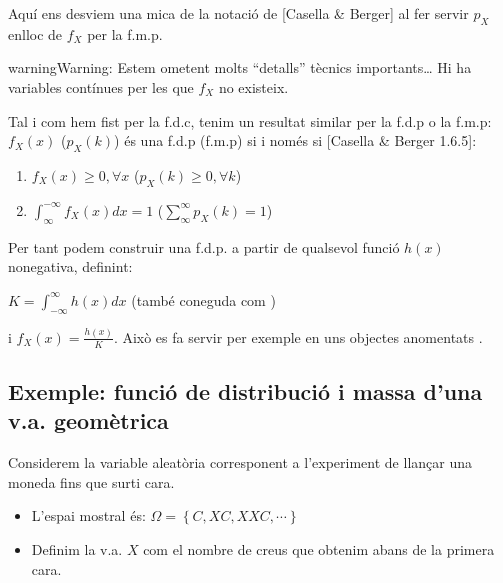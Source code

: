 \documentclass[letterpaper,10pt,english]{sphinxmanual}
\begin{document}
Aquí ens desviem una mica de la notació de {[}Casella \& Berger{]} al fer servir \(p_X\) enlloc de \(f_X\) per la f.m.p.

\begin{sphinxadmonition}{warning}{Warning:}
Estem ometent molts “detalls” tècnics importants… Hi ha variables contínues per les que \(f_X\) no existeix.
\end{sphinxadmonition}

Tal i com hem fist per la f.d.c, tenim un resultat similar per la f.d.p o la f.m.p: \(f_X\left(x\right)\) (\(p_X\left(k\right)\))
és una f.d.p (f.m.p) si i només si {[}Casella \& Berger 1.6.5{]}:
\begin{enumerate}
%
\item {} 
\(f_X\left(x\right) \geq 0, \forall x\) (\(p_X\left(k\right) \geq 0, \forall k\))

\item {} 
\(\int_{\infty}^{-\infty} f_X\left(x\right)dx = 1\) (\(\sum_{\infty}^{\infty} p_X\left(k\right) = 1\))

\end{enumerate}

Per tant podem construir una f.d.p. a partir de qualsevol funció \(h\left(x\right)\) no\sphinxhyphen{}negativa, definint:

\(K = \int_{-\infty}^{\infty} h\left(x\right)dx\) (també coneguda com )

i \(f_X\left(x\right) = \frac{h\left(x\right)}{K}\). Això es fa servir per exemple
en uns objectes anomentats .


\subsection{Exemple: funció de distribució i massa d’una v.a. geomètrica}
\label{\detokenize{0_Intro/0_1_Repas_probabilitat:exemple-funcio-de-distribucio-i-massa-d-una-v-a-geometrica}}
Considerem la variable aleatòria corresponent a l’experiment de
llançar una moneda fins que surti cara.
\begin{itemize}
\item {} 
L’espai mostral és: \(\Omega = \left\{C, XC, XXC, \cdots \right\}\)

\item {} 
Definim la v.a. \(X\) com el nombre de creus que obtenim abans de la primera cara.

\end{itemize}
\end{document}
